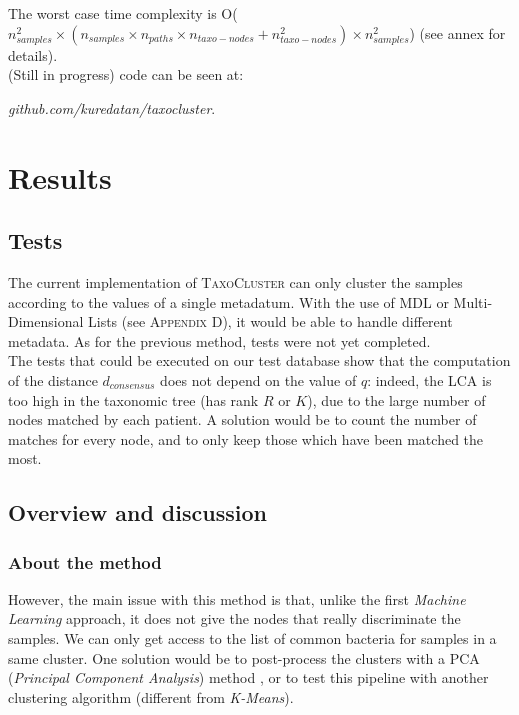 \documentclass{report}
\begin{document}
The worst case time complexity is O($n_{samples}^{2} \times (n_{samples} \times n_{paths} \times n_{taxo-nodes} + n_{taxo-nodes}^{2}) \times n_{samples}^{2}$) (see annex for details).\\

(Still in progress) code can be seen at: \\\begin{center}\emph{github.com/kuredatan/taxocluster}.\end{center}

\section{Results}

\subsection{Tests}

The current implementation of \textsc{TaxoCluster} can only cluster the samples according to the values of a single metadatum. With the use of MDL or Multi-Dimensional Lists (see \textsc{Appendix D}), it would be able to handle different metadata. As for the previous method, tests were not yet completed.\\

The tests that could be executed on our test database show that the computation of the distance $d_{consensus}$ does not depend on the value of $q$: indeed, the LCA is too high in the taxonomic tree (has rank $R$ or $K$), due to the large number of nodes matched by each patient. A solution would be to count the number of matches for every node, and to only keep those which have been matched the most.\\ 

\subsection{Overview and discussion}

\subsubsection{About the method}

However, the main issue with this method is that, unlike the first \emph{Machine Learning} approach, it does not give the nodes that really discriminate the samples. We can only get access to the list of common bacteria for samples in a same cluster. One solution would be to post-process the clusters with a PCA (\emph{Principal Component Analysis}) method \cite{PCA}, or to test this pipeline with another clustering algorithm (different from \emph{K-Means}).
\end{document}
